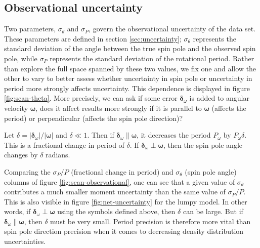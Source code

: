 \subsection{Observational uncertainty}
\label{sec:scan-uncertainty}
Two parameters, $\sigma_\theta$ and $\sigma_P$, govern the observational uncertainty of the data set. These parameters are defined in section \ref{sec:uncertainty}; $\sigma_\theta$ represents the standard deviation of the angle between the true spin pole and the observed spin pole, while $\sigma_P$ represents the standard deviation of the rotational period. Rather than explore the full space spanned by these two values, we fix one and allow the other to vary to better assess whether uncertainty in spin pole or uncertainty in period more strongly affects uncertainty. This dependence is displayed in figure \ref{fig:scan-theta}. More precisely, we can ask if some error $\bm {\delta}_\omega$ is added to angular velocity $\bm \omega$, does it affect results more strongly if it is parallel to $\bm \omega$ (affects the period) or perpendicular (affects the spin pole direction)?

Let $\delta = |\bm{\delta}_\omega| / |\bm \omega|$ and $\delta \ll 1$. Then if $\bm {\delta}_\omega \parallel \bm \omega$, it decreases the period $P_\omega$ by $P_\omega \delta$. This is a fractional change in period of $\delta$. If $\bm {\delta}_\omega \perp \bm \omega$, then the spin pole angle changes by $\delta$ radians.

Comparing the $\sigma_P / P$ (fractional change in period) and $\sigma_\theta$ (spin pole angle) columns of figure \ref{fig:scan-observational}, one can see that a given value of $\sigma_\theta$ contributes a much smaller moment uncertainty than the same value of $\sigma_P/ P$. This is also visible in figure \ref{fig:net-uncertainty} for the lumpy model. In other words, if $\bm {\delta}_\omega \perp \bm \omega$ using the symbols defined above, then $\delta$ can be large. But if $\bm{\delta}_\omega  \parallel \bm \omega$, then $\delta$ must be very small. Period precision is therefore more vital than spin pole direction precision when it comes to decreasing density distribution uncertainties.




